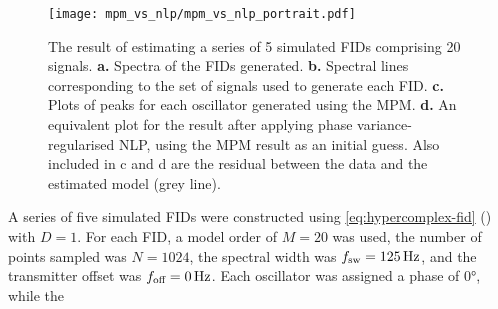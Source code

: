 \begin{figure}
    \centering
    \texttt{[image: mpm\_vs\_nlp/mpm\_vs\_nlp\_portrait.pdf]}
    \caption[
        The result of estimating a series of 5 simulated \acsp{FID}
        using both the \acs{MPM} in isolation, and also with phase
        variance-regularised \acs{NLP} used afterwards.
    ]{
        The result of estimating a series of 5 simulated \acp{FID} comprising
        20 signals.
        \textbf{a.} Spectra of the \acp{FID} generated.
        \textbf{b.} Spectral lines corresponding to the set of signals
        used to generate each \ac{FID}.
        \textbf{c.} Plots of peaks for each oscillator generated using
        the \acs{MPM}.
        \textbf{d.} An equivalent plot for the result after applying phase
        variance-regularised \acs{NLP}, using the \acs{MPM} result as an
        initial guess.  Also included in c and d are the
        residual between the data and the estimated model (grey
        line).
    }
    \label{fig:mpm_vs_nlp}
\end{figure}
A series of five simulated \acp{FID} were constructed using
\cref{eq:hypercomplex-fid} () with $D=1$. For
each \ac{FID}, a model order
of $M=20$ was used, the number of points sampled was $N = 1024$, the spectral
width was $f_{\mathrm{sw}}=\qty{125}{\hertz}$, and the transmitter offset was $f_{\text{off}}
= \qty{0}{\hertz}$.  Each oscillator was assigned a phase of \ang{0}, while the
